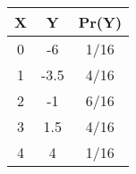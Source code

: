 \begin{tabular}{|c|c|c|}
\hline
X	&Y	&Pr(Y)\\
\hline
0	&-6	&1/16\\\hline
1	&-3.5	&4/16\\\hline
2	&-1	&6/16\\\hline
3	&1.5	&4/16\\\hline
4	&4	&1/16\\
\hline
\end{tabular}
